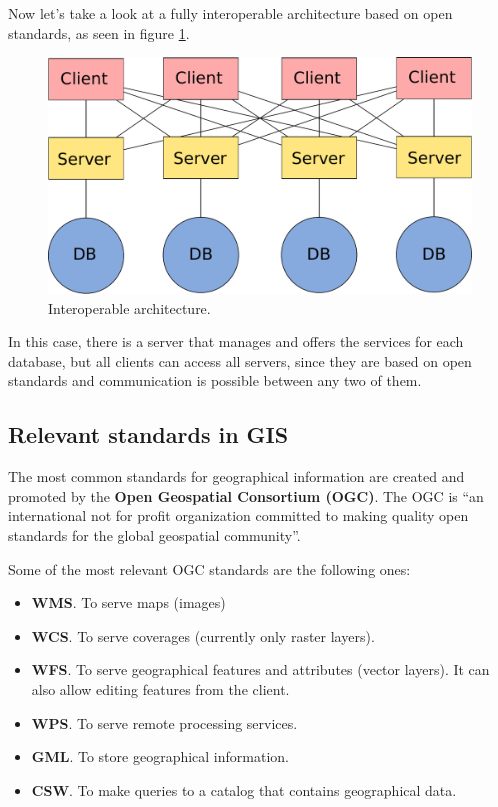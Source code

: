 Now let's take a look at a fully interoperable architecture based on open standards, as seen in figure \ref{Fig:Interoperable}.

\begin{figure}[!hbt]   
\centering
\includegraphics[width=.7\columnwidth]{Software/Interoperable.pdf}
\caption{\small Interoperable architecture.}
\label{Fig:Interoperable} 
\end{figure}

In this case, there is a server that manages and offers the services for each database, but all clients can access all servers, since they are based on open standards and communication is possible between any two of them.

\subsection{Relevant standards in GIS}

The most common standards for geographical information are created and promoted by the  \textbf{Open Geospatial Consortium (OGC)}. The OGC is ``an international not for profit organization committed to making quality open standards for the global geospatial community''.

Some of the most relevant OGC standards are the following ones:

\begin{itemize}
\item \textbf{WMS}. To serve maps (images)
\item \textbf{WCS}. To serve coverages (currently only raster layers).
\item \textbf{WFS}. To serve geographical features and attributes (vector layers). It can also allow editing features from the client.
\item \textbf{WPS}. To serve remote processing services.
\item \textbf{GML}. To store geographical information.
\item \textbf{CSW}. To make queries to a catalog that contains geographical data.
\end{itemize}

